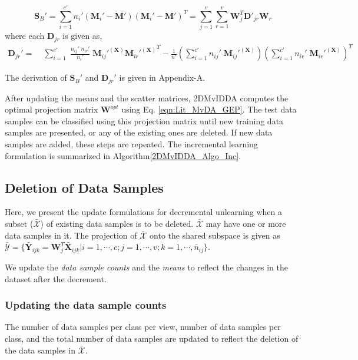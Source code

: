 \begin{equation}
\label{eqn:SbI}
\textbf{S}_B' = \sum\limits_{i=1}^{c'} n_{i}' (\textbf{M}_{i}' - \textbf{M}') (\textbf{M}_{i}' - \textbf{M}')^T = \sum\limits_{j=1}^{v} \sum\limits_{r=1}^{v} \textbf{W}_j^T \textbf{D}'_{jr} \textbf{W}_r
\end{equation}
where each $\textbf{D}_{jr}$ is given as,
\begin{equation}
\label{eqn:DjrI}
\begin{split}
\textbf{D}_{jr}' = & \; \sum\limits_{i=1}^{c'} \; \frac{n_{ij}' \; n_{ir}'}{n_{i}'} \; {\textbf{M}_{ij}'}^{(\textbf{X})} {{\textbf{M}_{ir}'}^{(\textbf{X})}}^T - \frac{1}{n'} \left (\sum\limits_{i=1}^{c'} n_{ij}' \; {\textbf{M}_{ij}'}^{(\textbf{X})} \right ) \left (\sum\limits_{i=1}^{c'} n_{ir}' \; {{\textbf{M}_{ir}'}^{(\textbf{X})}} \right )^T
\end{split}
\end{equation}

\noindent
The derivation of $\textbf{S}_{B}'$ and $\textbf{D}_{jr}'$ is given in Appendix-A.%

After updating the means and the scatter matrices, 2DMvIDDA computes the optimal projection matrix $\textbf{W}^{opt}$ using Eq. \ref{eqn:Lit_MvDA_GEP}. The test data samples can be classified using this projection matrix until new training data samples are presented, or any of the existing ones are deleted. If new data samples are added, these steps are repeated. The incremental learning formulation is summarized in Algorithm\ref{2DMvIDDA_Algo_Inc}.




\subsection{Deletion of Data Samples}
\label{subs:2DMvIDDA_Dec}
Here, we present the update formulations for decremental unlearning when a subset ($\bar{\mathcal{X}}$) of existing data samples is to be deleted. $\bar{\mathcal{X}}$ may have one or more data samples in it. The projection of $\bar{\mathcal{X}}$ onto the shared subspace is given as $\bar{\mathcal{Y}} = \{ \bar{\textbf{Y}}_{ijk} = \textbf{W}_j^T \bar{\textbf{X}}_{ijk} | i=1, \cdots ,c; j=1, \cdots ,v; k=1, \cdots ,\bar{n}_{ij} \}$.

We update the \textit{data sample counts} and the \textit{means} to reflect the changes in the dataset after the decrement.



\subsubsection{Updating the data sample counts}
\label{ssubs:2DMvIDDA_Inc_n}
The number of data samples per class per view, number of data samples per class, and the total number of data samples are updated to reflect the deletion of the data samples in $\bar{\mathcal{X}}$.


